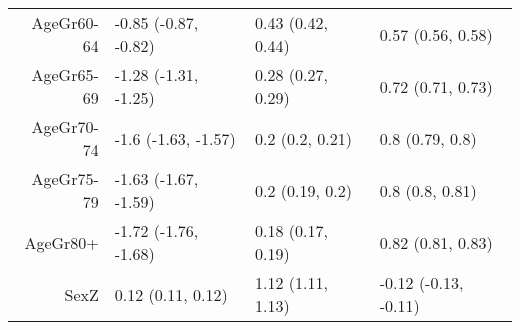 \begin{table}[ht]
\begin{tabular}{rlll}
  AgeGr60-64 & -0.85 (-0.87, -0.82) & 0.43 (0.42, 0.44) & 0.57 (0.56, 0.58) \\ 
  AgeGr65-69 & -1.28 (-1.31, -1.25) & 0.28 (0.27, 0.29) & 0.72 (0.71, 0.73) \\ 
  AgeGr70-74 & -1.6 (-1.63, -1.57) & 0.2 (0.2, 0.21) & 0.8 (0.79, 0.8) \\ 
  AgeGr75-79 & -1.63 (-1.67, -1.59) & 0.2 (0.19, 0.2) & 0.8 (0.8, 0.81) \\ 
  AgeGr80+ & -1.72 (-1.76, -1.68) & 0.18 (0.17, 0.19) & 0.82 (0.81, 0.83) \\ 
  SexZ & 0.12 (0.11, 0.12) & 1.12 (1.11, 1.13) & -0.12 (-0.13, -0.11) \\ 
   \hline
\end{tabular}
\end{table}

